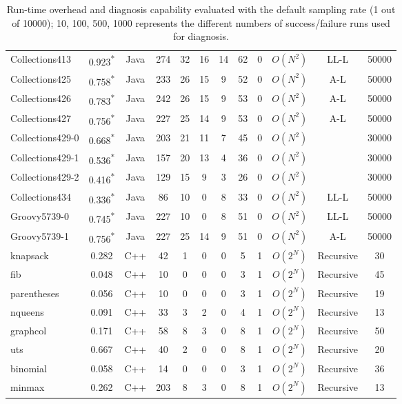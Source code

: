 \begin{table}[h!]
\begin{tabular}{lccccccccccc}
    Collections413    & 0.923\textsuperscript{*}  & Java  & 274 & 32 & 16 & 14 & 62 & 0 & $O(N^{2})$ & LL-L & 50000   \\
    Collections425    & 0.758\textsuperscript{*}  & Java  & 233 & 26 & 15 & 9  & 52 & 0 & $O(N^{2})$ & A-L & 50000    \\
    Collections426    & 0.783\textsuperscript{*}  & Java  & 242 & 26 & 15 & 9  & 53 & 0 & $O(N^{2})$ & A-L & 50000   \\
    Collections427    & 0.756\textsuperscript{*} & Java  & 227 & 25 & 14 & 9  & 53 & 0 & $O(N^{2})$ & A-L & 50000   \\
    Collections429-0    & 0.668\textsuperscript{*}  & Java  & 203 & 21 & 11 & 7 & 45 & 0 & $O(N^{2})$ & & 30000       \\
    Collections429-1    & 0.536\textsuperscript{*}  & Java  & 157 & 20 & 13 & 4 & 36 & 0 & $O(N^{2})$ & & 30000     \\
    Collections429-2    & 0.416\textsuperscript{*}  & Java  & 129 & 15 & 9 & 3  & 26 & 0 & $O(N^{2})$ & & 30000 \\
    Collections434    & 0.336\textsuperscript{*}   & Java  & 86  & 10 & 0 & 8 & 33 & 0 & $O(N^{2})$ & LL-L & 50000     \\
    \midrule
    Groovy5739-0      & 0.745\textsuperscript{*}  & Java  & 227 & 10 & 0 & 8 & 51 & 0 & $O(N^{2})$ & LL-L& 50000 \\
    Groovy5739-1      & 0.756\textsuperscript{*}  & Java  &227  & 25 &  14 & 9 & 51 & 0 & $O(N^{2})$ & A-L & 50000 \\
    \midrule
    \midrule
    knapsack      &  0.282  & C++  & 42 & 1 & 0 & 0 & 5 & 1 & $O(2^{N})$ & Recursive & 30  \\
    fib      &  0.048 & C++  & 10 & 0 & 0 & 0 & 3 & 1 & $O(2^{N})$ & Recursive & 45 \\
    parentheses      & 0.056   & C++  & 10 & 0 & 0 & 0 & 3 & 1 & $O(2^{N})$ & Recursive & 19 \\
    nqueens      & 0.091  & C++  & 33 & 3 & 2 & 0 & 4 & 1 & $O(2^{N})$ & Recursive & 13 \\
    graphcol      &  0.171  & C++  & 58 & 8 & 3 & 0 & 8 & 1 & $O(2^{N})$ & Recursive & 50 \\
    uts      &  0.667  & C++  & 40  & 2 & 0 & 0 & 8 & 1 & $O(2^{N})$ & Recursive & 20 \\
    binomial      &  0.058  & C++  & 14 & 0 & 0 & 0 & 3 & 1 & $O(2^{N})$ & Recursive & 36 \\
    minmax      &  0.262  & C++  & 203 & 8 & 3 & 0 & 8 & 1 & $O(2^{N})$  & Recursive & 13 \\


    \bottomrule
   \end{tabular}
  \caption{Run-time overhead and diagnosis capability evaluated with the default sampling rate (1 out of 10000); 10, 100, 500, 1000 represents the different numbers of success/failure runs used for diagnosis.}
  \label{tab:LBR}
\end{table}